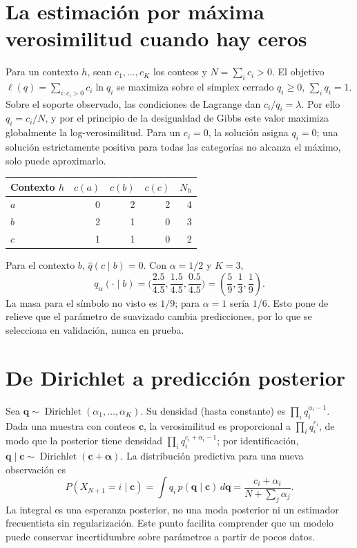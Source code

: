 \section*{La estimación por máxima verosimilitud cuando hay ceros}
Para un contexto $h$, sean $c_1,\ldots,c_K$ los conteos y $N=\sum_i c_i>0$.
El objetivo $\ell(q)=\sum_{i:c_i>0}c_i\ln q_i$ se maximiza sobre el símplex
cerrado $q_i\geq0$, $\sum_iq_i=1$. Sobre el soporte observado, las condiciones
de Lagrange dan $c_i/q_i=\lambda$. Por ello $q_i=c_i/N$, y por el principio
de la desigualdad de Gibbs este valor maximiza globalmente la log-verosimilitud.
Para un $c_i=0$, la solución asigna $q_i=0$; una solución estrictamente positiva
para todas las categorías no alcanza el máximo, solo puede aproximarlo.

\begin{center}
\begin{tabular}{lrrrr}\toprule
Contexto $h$ & $c(a)$ & $c(b)$ & $c(c)$ & $N_h$\\\midrule
$a$ & 0 & 2 & 2 & 4\\
$b$ & 2 & 1 & 0 & 3\\
$c$ & 1 & 1 & 0 & 2\\\bottomrule
\end{tabular}
\end{center}
Para el contexto $b$, $\hat q(c\mid b)=0$. Con $\alpha=1/2$ y $K=3$,
\[
q_\alpha(\cdot\mid b)=\biggl(\frac{2.5}{4.5},\frac{1.5}{4.5},
\frac{0.5}{4.5}\biggr)=\left(\frac59,\frac13,\frac19\right).
\]
La masa para el símbolo no visto es $1/9$; para $\alpha=1$ sería $1/6$.
Esto pone de relieve que el parámetro de suavizado cambia predicciones,
por lo que se selecciona en validación, nunca en prueba.

\section*{De Dirichlet a predicción posterior}
Sea $\mathbf q\sim\operatorname{Dirichlet}(\alpha_1,\ldots,\alpha_K)$.
Su densidad (hasta constante) es $\prod_iq_i^{\alpha_i-1}$.
Dada una muestra con conteos $\mathbf c$, la verosimilitud es proporcional
a $\prod_iq_i^{c_i}$, de modo que la posterior tiene densidad
$\prod_iq_i^{c_i+\alpha_i-1}$; por identificación,
$\mathbf q\mid \mathbf c\sim\operatorname{Dirichlet}(\mathbf c+\boldsymbol\alpha)$.
La distribución predictiva para una nueva observación es
\[
P(X_{N+1}=i\mid\mathbf c)=\int q_i\,p(\mathbf q\mid\mathbf c)\,d\mathbf q
=\frac{c_i+\alpha_i}{N+\sum_j\alpha_j}.
\]
La integral es una esperanza posterior, no una moda posterior ni un estimador
frecuentista sin regularización. Este punto facilita comprender que un modelo
puede conservar incertidumbre sobre parámetros a partir de pocos datos.

